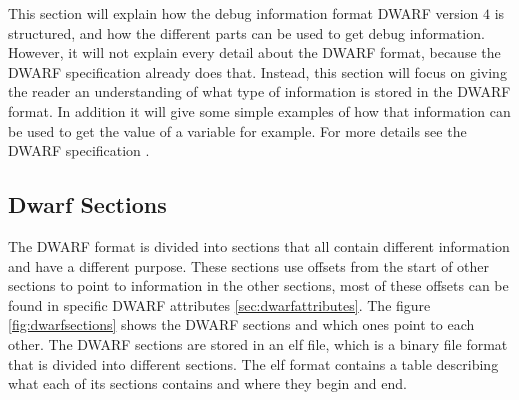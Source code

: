 

This section will explain how the debug information format \acrfull{DWARF} version $4$ is structured, and how the different parts can be used to get debug information.
However, it will not explain every detail about the \gls{DWARF} format, because the \gls{DWARF} specification already does that.
Instead, this section will focus on giving the reader an understanding of what type of information is stored in the \gls{DWARF} format.
In addition it will give some simple examples of how that information can be used to get the value of a variable for example.
For more details see the \gls{DWARF} specification \cite{dwarf}.


\subsection{Dwarf Sections}
 


The \gls{DWARF} format is divided into sections that all contain different information and have a different purpose.
These sections use offsets from the start of other sections to point to information in the other sections, most of these offsets can be found in specific \gls{DWARF} attributes \ref{sec:dwarfattributes}.
The figure \ref{fig:dwarfsections} shows the \gls{DWARF} sections and which ones point to each other.
The \gls{DWARF} sections are stored in an \gls{elf} file, which is a binary file format that is divided into different sections.
The \gls{elf} format contains a table describing what each of its sections contains and where they begin and end.




